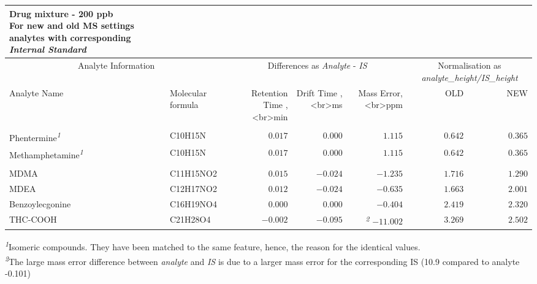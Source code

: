 \setlength{\LTpost}{0mm}
\begin{longtable}{llrrrrr}
\caption*{
{\large \textbf{Drug mixture - 200 ppb}} \\ 
{\small For \textbf{new} and \textbf{old} MS settings analytes with corresponding \emph{Internal Standard}}
} \\ 
\toprule
\multicolumn{2}{c}{Analyte Information} & \multicolumn{3}{c}{Differences as  \emph{Analyte} - \emph{IS}} & \multicolumn{2}{c}{Normalisation as  \emph{analyte\_height/IS\_height}} \\ 
\cmidrule(lr){1-2} \cmidrule(lr){3-5} \cmidrule(lr){6-7}
Analyte Name & Molecular formula & Retention Time ,<br>min & Drift Time ,<br>ms & Mass Error,<br>ppm & OLD & NEW \\ 
\midrule\addlinespace[2.5pt]
\multicolumn{7}{l}{\emph{Methamphetamine-d9}} \\ 
\midrule\addlinespace[2.5pt]
Phentermine\textsuperscript{\textit{1}} & C10H15N & $0.017$ & $0.000$ & $1.115$ & $0.642$ & $0.365$ \\ 
Methamphetamine\textsuperscript{\textit{1}} & C10H15N & $0.017$ & $0.000$ & $1.115$ & $0.642$ & $0.365$ \\ 
\midrule\addlinespace[2.5pt]
\multicolumn{7}{l}{\vspace*{-5mm}} \\ 
\midrule\addlinespace[2.5pt]
MDMA & C11H15NO2 & $0.015$ & $-0.024$ & $-1.235$ & $1.716$ & $1.290$ \\ 
MDEA & C12H17NO2 & $0.012$ & $-0.024$ & $-0.635$ & $1.663$ & $2.001$ \\ 
Benzoylecgonine & C16H19NO4 & $0.000$ & $0.000$ & $-0.404$ & $2.419$ & $2.320$ \\ 
THC-COOH & C21H28O4 & $-0.002$ & $-0.095$ & \textsuperscript{\textit{2}} $-11.002$ & $3.269$ & $2.502$ \\ 
\bottomrule
\end{longtable}
\begin{minipage}{\linewidth}
\textsuperscript{\textit{1}}Isomeric compounds. They have been matched to the same feature, hence, the reason for the identical values.\\
\textsuperscript{\textit{2}}The large mass error difference between \emph{analyte} and \emph{IS} is due to a larger mass error for the corresponding IS (10.9 compared to analyte -0.101)\\
\end{minipage}

